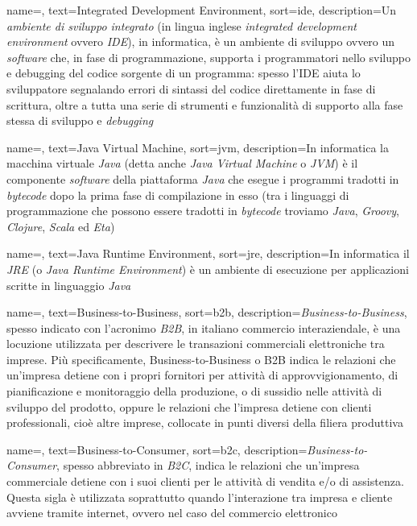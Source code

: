 {
    name=,
    text=Integrated Development Environment,
    sort=ide,
    description={Un \textit{ambiente di sviluppo integrato} (in lingua inglese \textit{integrated development environment} ovvero \textit{IDE}), in informatica, è un ambiente di sviluppo ovvero un \textit{software} che, in fase di programmazione, supporta i programmatori nello sviluppo e debugging del codice sorgente di un programma: spesso l'IDE aiuta lo sviluppatore segnalando errori di sintassi del codice direttamente in fase di scrittura, oltre a tutta una serie di strumenti e funzionalità di supporto alla fase stessa di sviluppo e \textit{debugging}}
}

{
    name=,
    text=Java Virtual Machine,
    sort=jvm,
    description={In informatica la macchina virtuale \textit{Java} (detta anche \textit{Java Virtual Machine} o \textit{JVM}) è il componente \textit{software} della piattaforma \textit{Java} che esegue i programmi tradotti in \textit{bytecode} dopo la prima fase di compilazione in esso (tra i linguaggi di programmazione che possono essere tradotti in \textit{bytecode} troviamo \textit{Java}, \textit{Groovy}, \textit{Clojure}, \textit{Scala} ed \textit{Eta})}
}

{
    name=,
    text=Java Runtime Environment,
    sort=jre,
    description={In informatica il \textit{JRE} (o \textit{Java Runtime Environment}) è un ambiente di esecuzione per applicazioni scritte in linguaggio \textit{Java}}
}

{
    name=,
    text=Business-to-Business,
    sort=b2b,
    description={\textit{Business-to-Business}, spesso indicato con l'acronimo \textit{B2B}, in italiano commercio interaziendale, è una locuzione utilizzata per descrivere le transazioni commerciali elettroniche tra imprese. Più specificamente, Business-to-Business o B2B indica le relazioni che un'impresa detiene con i propri fornitori per attività di approvvigionamento, di pianificazione e monitoraggio della produzione, o di sussidio nelle attività di sviluppo del prodotto, oppure le relazioni che l'impresa detiene con clienti professionali, cioè altre imprese, collocate in punti diversi della filiera produttiva}
}

{
    name=,
    text=Business-to-Consumer,
    sort=b2c,
    description={\textit{Business-to-Consumer}, spesso abbreviato in \textit{B2C}, indica le relazioni che un'impresa commerciale detiene con i suoi clienti per le attività di vendita e/o di assistenza. Questa sigla è utilizzata soprattutto quando l'interazione tra impresa e cliente avviene tramite internet, ovvero nel caso del commercio elettronico}
}

